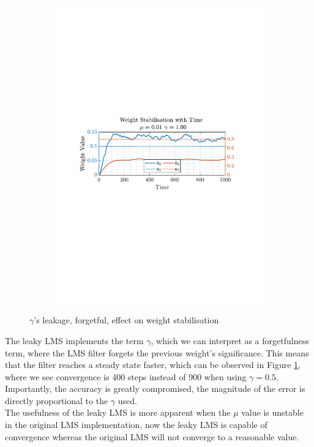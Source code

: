 \documentclass[12pt]{article}
\numberwithin{equation}{section}
\begin{document}
\begin{figure}[H]
\begin{subfigure}{0.49\textwidth}
					\includegraphics[trim={2.2cm 11.2cm 3.00cm  11.2cm}, clip, width=\textwidth]{../MATLAB/figures/q2_1f_fig08.pdf} 
					\captionsetup{justification=centering}
				\end{subfigure}
				\captionsetup{justification=centering}
				\caption{$\gamma$'s leakage, forgetful, effect on weight stabilisation}
				\label{fig: 2-1f}
			\end{figure}
		
		The leaky LMS implements the term $\gamma$, which we can interpret as a forgetfulness term, where the LMS filter forgets the previous weight's significance. This means that the filter reaches a steady state faster, which can be observed in Figure \ref{fig: 2-1f}, where we see convergence is 400 steps instead of 900 when using $\gamma=0.5$. \\
		Importantly, the accuracy is greatly compromised, the magnitude of the error is directly proportional to the $\gamma$ used. \\
		The usefulness of the leaky LMS is more apparent when the $\mu$ value is unstable in the original LMS implementation, now the leaky LMS is capable of convergence whereas the original LMS will not converge to a reasonable value.
		 
\end{document}
